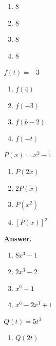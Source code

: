 \documentclass[10pt,]{book}
\theoremstyle{plain}
\theoremstyle{definition}
\theoremstyle{definition}
\theoremstyle{definition}
\theoremstyle{definition}
\numberwithin{equation}{part}
\begin{document}
\begin{exerciselist}
\begin{exercisegroup}
\begin{multicols}{2}
\begin{enumerate}[label=\alph*]
\item\hypertarget{li-518}{}\(8\)%
\item\hypertarget{li-519}{}\(8\)%
\item\hypertarget{li-520}{}\(8\)%
\item\hypertarget{li-521}{}\(8 \)%
\end{enumerate}
\end{multicols}
%
\exercise[62.]\hypertarget{exercise-131}{}\(f (t) = -3\) \leavevmode%
\begin{multicols}{2}
\begin{enumerate}[label=\alph*]
\item\hypertarget{li-522}{}\(f (4)\)%
\item\hypertarget{li-523}{}\(f (-3)\)%
\item\hypertarget{li-524}{}\(f (b - 2)\)%
\item\hypertarget{li-525}{}\(f (-t)\)%
\end{enumerate}
\end{multicols}
%
\exercise[63.]\hypertarget{exercise-132}{}\(P(x) = x^3 - 1\) \leavevmode%
\begin{multicols}{2}
\begin{enumerate}[label=\alph*]
\item\hypertarget{li-526}{}\(P(2x)\)%
\item\hypertarget{li-527}{}\(2P(x)\)%
\item\hypertarget{li-528}{}\(P(x^2)\)%
\item\hypertarget{li-529}{}\([P(x)]^2\)%
\end{enumerate}
\end{multicols}
%
\par\smallskip
\noindent\textbf{Answer.}\hypertarget{answer-75}{}\quad
\leavevmode%
\begin{multicols}{2}
\begin{enumerate}[label=\alph*]
\item\hypertarget{li-530}{}\(8x^3 - 1\)%
\item\hypertarget{li-531}{}\(2x^3 - 2\)%
\item\hypertarget{li-532}{}\(x^6 - 1\)%
\item\hypertarget{li-533}{}\(x^6 - 2x^3 + 1 \)%
\end{enumerate}
\end{multicols}
%
\exercise[64.]\hypertarget{exercise-133}{}\(Q(t) = 5t^3\) \leavevmode%
\begin{multicols}{2}
\begin{enumerate}[label=\alph*]
\item\hypertarget{li-534}{}\(Q(2t)\)%

\end{enumerate}
\end{multicols}
\end{exercisegroup}
\end{exerciselist}
\end{document}
